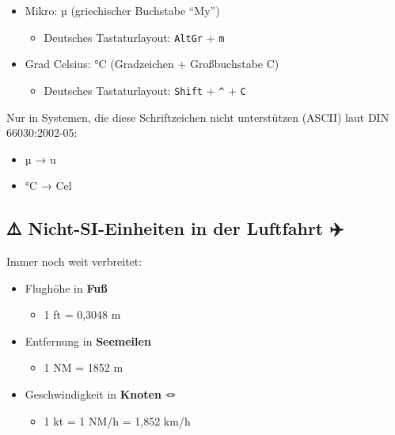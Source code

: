 \documentclass[
  11pt,
]{article}
\providecommand{\tightlist}{%
  \setlength{\itemsep}{0pt}\setlength{\parskip}{0pt}}
\begin{document}
\begin{itemize}
\tightlist
\item
  Mikro: µ (griechischer Buchstabe ``My'')

  \begin{itemize}
  \tightlist
  \item
    Deutsches Tastaturlayout: \texttt{AltGr} + \texttt{m}
  \end{itemize}
\item
  Grad Celsius: °C (Gradzeichen + Großbuchstabe C)

  \begin{itemize}
  \tightlist
  \item
    Deutsches Tastaturlayout: \texttt{Shift} + \texttt{\^{}} +
    \texttt{C}
  \end{itemize}
\end{itemize}

Nur in Systemen, die diese Schriftzeichen nicht unterstützen (ASCII)
laut DIN 66030:2002-05:

\begin{itemize}
\tightlist
\item
  µ → u
\item
  °C → Cel
\end{itemize}

\subsection{⚠️ Nicht-SI-Einheiten in der Luftfahrt
✈️}\label{nicht-si-einheiten-in-der-luftfahrt}

Immer noch weit verbreitet:

\begin{itemize}
\tightlist
\item
  Flughöhe in \textbf{Fuß} 🦶

  \begin{itemize}
  \tightlist
  \item
    1 ft = 0,3048 m
  \end{itemize}
\item
  Entfernung in \textbf{Seemeilen} 🚢

  \begin{itemize}
  \tightlist
  \item
    1 NM = 1852 m
  \end{itemize}
\item
  Geschwindigkeit in \textbf{Knoten} 🪢

  \begin{itemize}
  \tightlist
  \item
    1 kt = 1 NM/h = 1,852 km/h
  \end{itemize}
\end{itemize}
\end{document}
